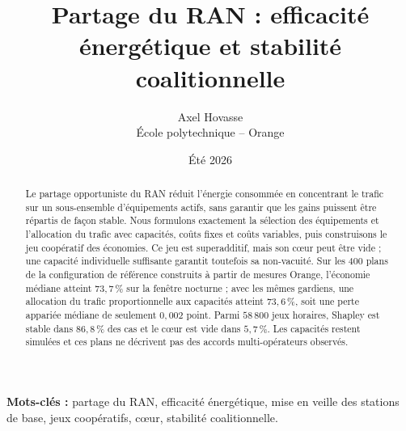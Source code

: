 \documentclass{article}
\theoremstyle{definition}
\theoremstyle{remark}
\theoremstyle{remark}
\theoremstyle{plain}
\theoremstyle{definition}
\theoremstyle{definition}
\theoremstyle{definition}
\begin{document}
\title{Partage du RAN : efficacité énergétique et stabilité coalitionnelle}

\author{
Axel Hovasse\\
École polytechnique -- Orange
}

\date{Été 2026}

\maketitle

\begin{abstract}
Le partage opportuniste du RAN réduit l'énergie consommée en concentrant le
trafic sur un sous-ensemble d'équipements actifs, sans garantir que les gains
puissent être répartis de façon stable. Nous formulons exactement la sélection
des équipements et l'allocation du trafic avec capacités, coûts fixes et coûts
variables, puis construisons le jeu coopératif des économies. Ce jeu est
superadditif, mais son cœur peut être vide ; une capacité individuelle
suffisante garantit toutefois sa non-vacuité. Sur les 400 plans de la
configuration de référence construits à partir de mesures Orange, l'économie
médiane atteint
\(73{,}7\,\%\) sur la fenêtre nocturne ; avec les mêmes gardiens, une allocation du trafic
proportionnelle aux capacités atteint \(73{,}6\,\%\), soit une perte appariée
médiane de seulement \(0{,}002\) point. Parmi \(58\,800\) jeux horaires,
Shapley est stable dans
\(86{,}8\,\%\) des cas et le cœur est vide dans \(5{,}7\,\%\). Les capacités
restent simulées et ces plans ne décrivent pas des accords multi-opérateurs
observés.
\end{abstract}

\noindent\textbf{Mots-clés :} partage du RAN, efficacité énergétique,
mise en veille des stations de base, jeux coopératifs, cœur, stabilité
coalitionnelle.















\clearpage
\appendix


\end{document}
